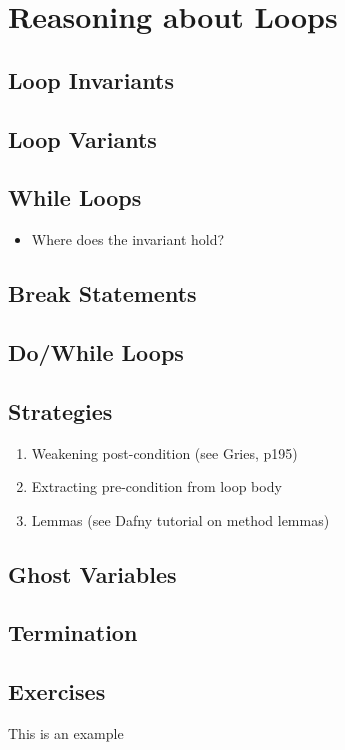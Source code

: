 \chapter{Reasoning about Loops}
\label{c_reasoning_loops}

\section{Loop Invariants}
\section{Loop Variants}
\section{While Loops}
\begin{itemize}
\item Where does the invariant hold?
\end{itemize}
\section{Break Statements}
\section{Do/While Loops}
\section{Strategies}
\begin{enumerate}
\item Weakening post-condition (see Gries, p195)
\item Extracting pre-condition from loop body
\item Lemmas (see Dafny tutorial on method lemmas)
\end{enumerate}
\section{Ghost Variables}

\section{Termination}
\section{Exercises}

\begin{ex}
This is an example
\end{ex}